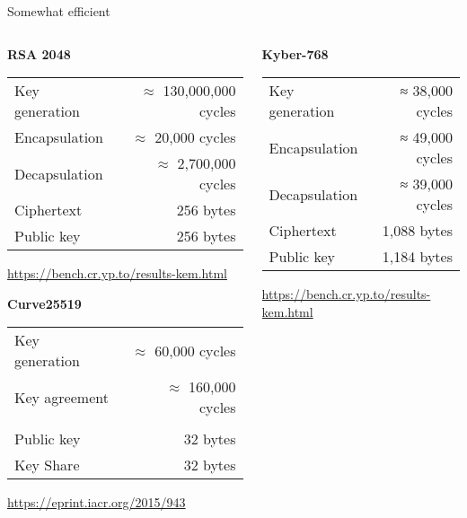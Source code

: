 \documentclass[xcolor=table,10pt,aspectratio=169]{beamer}
\begin{document}
\begin{frame}[label={sec:orgd1117d7}]{Somewhat efficient}
\begin{columns}[t]
\begin{column}{0.5\columnwidth}
\textbf{RSA 2048}

\begin{center}
\begin{tabular}{lr}
\toprule
Key generation & \(\approx\) 130,000,000 cycles\\
Encapsulation & \(\approx\) 20,000 cycles\\
Decapsulation & \(\approx\) 2,700,000 cycles\\
Ciphertext & 256 bytes\\
Public key & 256 bytes\\
\bottomrule
\end{tabular}

\end{center}

{\tiny \url{https://bench.cr.yp.to/results-kem.html} }

\textbf{Curve25519}

\begin{center}
\begin{tabular}{lr}
\toprule
Key generation & \(\approx\) 60,000 cycles\\
Key agreement & \(\approx\) 160,000 cycles\\
 & \\
Public key & 32 bytes\\
Key Share & 32 bytes\\
\bottomrule
\end{tabular}

\end{center}

\tiny \url{https://eprint.iacr.org/2015/943}
\end{column}
\begin{column}{0.5\columnwidth}
\textbf{Kyber-768}

\begin{center}
\begin{tabular}{lr}
\toprule
Key generation & ≈  38,000 cycles\\
Encapsulation & ≈  49,000 cycles\\
Decapsulation & ≈  39,000 cycles\\
Ciphertext & 1,088 bytes\\
Public key & 1,184 bytes\\
\bottomrule
\end{tabular}

\end{center}

\tiny \url{https://bench.cr.yp.to/results-kem.html}
\end{column}
\end{columns}
\end{frame}
\end{document}

